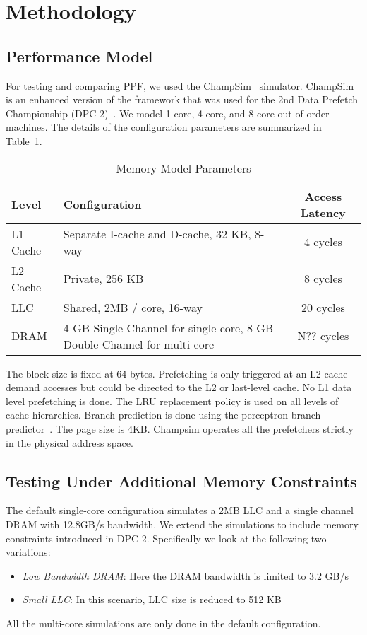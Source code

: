 \section{Methodology}
\label{Method}

\subsection{Performance Model}
\label{Method-Model}
For testing and comparing PPF, we used the ChampSim~\cite{Champsim} simulator.
ChampSim is an enhanced version of the framework that was used for the 2nd
Data Prefetch Championship (DPC-2)~\cite{DPC_2}. We model 1-core, 4-core, and
8-core out-of-order machines. The details of the configuration parameters are
summarized in Table~\ref{tab:Sim_params}.

\begin{table}[]
    \centering
    \begin{tabular}{|l|p{3.6cm}|c|}
    \hline
    Level & Configuration & Access Latency \\
    \hline
         L1 Cache & Separate I-cache and D-cache, 32 KB, 8-way & 4 cycles\\
         L2 Cache & Private, 256 KB & 8 cycles\\
         LLC & Shared, 2MB / core, 16-way & 20 cycles\\
         DRAM & 4 GB Single Channel for single-core, 8 GB Double Channel for multi-core & N?? cycles\\
    \hline
    \end{tabular}
    \caption{Memory Model Parameters}
    \label{tab:Sim_params}
\end{table}


The block size is fixed at 64 bytes. Prefetching is only triggered at an L2 cache
demand accesses but could be directed to the L2 or last-level cache. No L1
data level prefetching is done. The LRU replacement policy is used on all levels
of cache hierarchies. Branch prediction is done using the perceptron branch
predictor~\cite{Perc_Branch}.  The page size is 4KB.  Champsim operates
all the prefetchers strictly in the physical address space.

\subsection{Testing Under Additional Memory Constraints}
\label{Method-AdditionalMem}
The default single-core configuration simulates a 2MB LLC and a single
channel DRAM with 12.8GB/s bandwidth.  We extend the simulations to
include memory constraints introduced in DPC-2.  Specifically we look
at the following two variations:
\begin{itemize}
\item \textit{Low Bandwidth DRAM}: Here the DRAM bandwidth is limited
  to 3.2 GB/s
\item \textit{Small LLC}: In this scenario, LLC size is reduced to 512
  KB
\end{itemize}
All the multi-core simulations are only done in the default
configuration.

